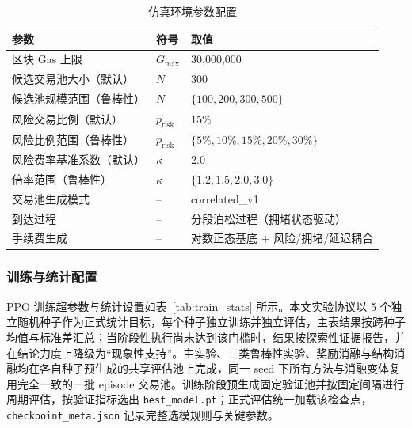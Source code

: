 \begin{table}[htbp]
\centering
\caption{仿真环境参数配置}
\label{tab:env_params}
\begin{tabular}{lll}
\toprule
参数 & 符号 & 取值 \\
\midrule
区块 Gas 上限 & $G_{\max}$ & 30{,}000{,}000 \\
候选交易池大小（默认） & $N$ & 300 \\
候选池规模范围（鲁棒性） & $N$ & $\{100, 200, 300, 500\}$ \\
风险交易比例（默认） & $p_{\text{risk}}$ & 15\% \\
风险比例范围（鲁棒性） & $p_{\text{risk}}$ & $\{5\%, 10\%, 15\%, 20\%, 30\%\}$ \\
风险费率基准系数（默认） & $\kappa$ & 2.0 \\
倍率范围（鲁棒性） & $\kappa$ & $\{1.2, 1.5, 2.0, 3.0\}$ \\
交易池生成模式 & -- & correlated\_v1 \\
到达过程 & -- & 分段泊松过程（拥堵状态驱动） \\
手续费生成 & -- & 对数正态基底 + 风险/拥堵/延迟耦合 \\
\bottomrule
\end{tabular}
\end{table}

\subsubsection{训练与统计配置}

PPO 训练超参数与统计设置如表~\ref{tab:train_stats} 所示。本文实验协议以 5 个独立随机种子作为正式统计目标，每个种子独立训练并独立评估，主表结果按跨种子均值与标准差汇总；当阶段性执行尚未达到该门槛时，结果按探索性证据报告，并在结论力度上降级为“现象性支持”。主实验、三类鲁棒性实验、奖励消融与结构消融均在各自种子预生成的共享评估池上完成，同一 seed 下所有方法与消融变体复用完全一致的一批 episode 交易池。训练阶段预生成固定验证池并按固定间隔进行周期评估，按验证指标选出 \texttt{best\_model.pt}；正式评估统一加载该检查点，\texttt{checkpoint\_meta.json} 记录完整选模规则与关键参数。

